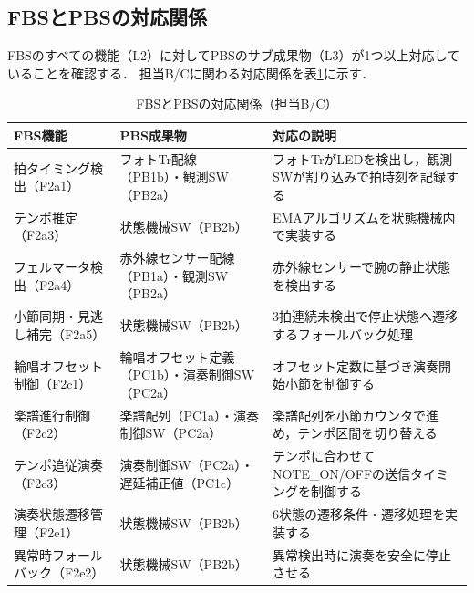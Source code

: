 \subsection{FBSとPBSの対応関係}

FBSのすべての機能（L2）に対してPBSのサブ成果物（L3）が1つ以上対応していることを確認する．
担当B/Cに関わる対応関係を表\ref{tab:fbs-pbs}に示す．

\begin{table}[H]
  \centering
  \begin{tabularx}{\linewidth}{llX}
    \toprule
    FBS機能 & PBS成果物 & 対応の説明 \\
    \midrule
    拍タイミング検出（F2a1） &
      フォトTr配線（PB1b）・観測SW（PB2a） &
      フォトTrがLEDを検出し，観測SWが割り込みで拍時刻を記録する \\
    テンポ推定（F2a3） &
      状態機械SW（PB2b） &
      EMAアルゴリズムを状態機械内で実装する \\
    フェルマータ検出（F2a4） &
      赤外線センサー配線（PB1a）・観測SW（PB2a） &
      赤外線センサーで腕の静止状態を検出する \\
    小節同期・見逃し補完（F2a5） &
      状態機械SW（PB2b） &
      3拍連続未検出で停止状態へ遷移するフォールバック処理 \\
    輪唱オフセット制御（F2c1） &
      輪唱オフセット定義（PC1b）・演奏制御SW（PC2a） &
      オフセット定数に基づき演奏開始小節を制御する \\
    楽譜進行制御（F2c2） &
      楽譜配列（PC1a）・演奏制御SW（PC2a） &
      楽譜配列を小節カウンタで進め，テンポ区間を切り替える \\
    テンポ追従演奏（F2c3） &
      演奏制御SW（PC2a）・遅延補正値（PC1c） &
      テンポに合わせてNOTE\_ON/OFFの送信タイミングを制御する \\
    演奏状態遷移管理（F2e1） &
      状態機械SW（PB2b） &
      6状態の遷移条件・遷移処理を実装する \\
    異常時フォールバック（F2e2） &
      状態機械SW（PB2b） &
      異常検出時に演奏を安全に停止させる \\
    \bottomrule
  \end{tabularx}
  \caption{FBSとPBSの対応関係（担当B/C）}
  \label{tab:fbs-pbs}
\end{table}
